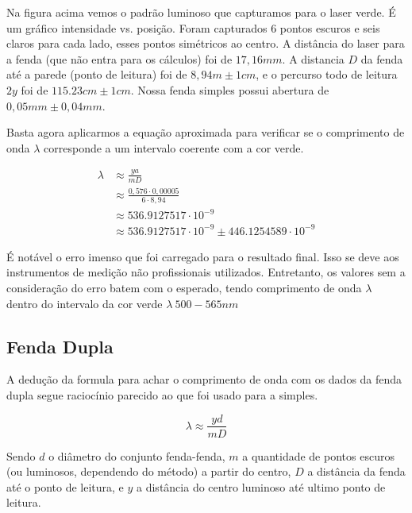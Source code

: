 \begin{multicols}{2}    %

Na figura acima vemos o padrão luminoso que capturamos para o laser verde. É um gráfico intensidade vs. posição. Foram capturados 6 pontos escuros e seis claros para cada lado, esses pontos simétricos ao centro. A distância do laser para a fenda (que não entra para os cálculos) foi de $17,16 mm$. A distancia $D$ da fenda até a parede (ponto de leitura) foi de $8,94m \pm 1cm$, e o percurso todo de leitura $2y$ foi de $115.23cm \pm 1cm$. Nossa fenda simples possui abertura de $0,05mm \pm 0,04mm$.

Basta agora aplicarmos a equação aproximada para verificar se o comprimento de onda $\lambda$ corresponde a um intervalo coerente com a cor verde.

\begin{align*}\label{calc_simples}
\lambda & \approx \frac{ya}{mD}\\
&\approx \frac{0,576\cdot 0,00005}{6 \cdot 8,94}\\
&\approx 536.9127517\cdot 10^{-9}\\
&\approx 536.9127517\cdot 10^{-9} \pm 446.1254589\cdot 10^{-9}
\end{align*}



É notável o erro imenso que foi carregado para o resultado final. Isso se deve aos instrumentos de medição não profissionais utilizados. Entretanto, os valores sem a consideração do erro batem com o esperado, tendo comprimento de onda $\lambda$ dentro do intervalo da cor verde $\lambda ~500-565 nm$


\subsection{Fenda Dupla}\label{fenda_dupla}

A dedução da formula para achar o comprimento de onda com os dados da fenda dupla segue raciocínio parecido ao que foi usado para a simples.

\begin{equation}
	\lambda \approx \frac{yd}{mD}
\end{equation}

Sendo $d$ o diâmetro do conjunto fenda-fenda, $m$ a quantidade de pontos escuros (ou luminosos, dependendo do método) a partir do centro, $D$ a distância da fenda até o ponto de leitura, e $y$ a distância do centro luminoso até ultimo ponto de leitura.

\end{multicols}

